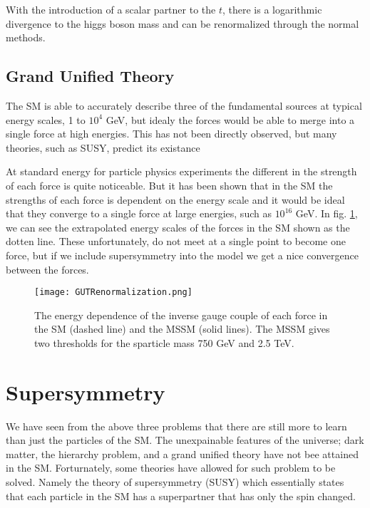 With the introduction of a scalar partner to the $t$, there is a logarithmic divergence to the higgs boson mass and can be renormalized through the normal methods.

\subsection{Grand Unified Theory}

The SM is able to accurately describe three of the fundamental sources at typical energy scales, 1 to $10^{4}$ GeV, but idealy the forces would be able to merge into a single force at high energies. This has not been directly observed, but many theories, such as SUSY, predict its existance %

At standard energy for particle physics experiments the different in the strength of each force is quite noticeable. But it has been shown that in the SM the strengths of each force is dependent on the energy scale and it would be ideal that they converge to a single force at large energies, such as $10^16$ GeV. In fig. \ref{GUT}, we can see the extrapolated energy scales of the forces in the SM shown as the dotten line. These unfortunately, do not meet at a single point to become one force, but if we include supersymmetry into the model we get a nice convergence between the forces.

\begin{figure}
 	\centering
	\texttt{[image: GUTRenormalization.png]}
 	\caption{The energy dependence of the inverse gauge couple of each force in the SM (dashed line) and the MSSM (solid lines). The MSSM gives two thresholds for the sparticle mass 750 GeV and 2.5 TeV.}
 	\label{GUT} 
\end{figure}

\section{Supersymmetry}

We have seen from the above three problems that there are still more to learn than just the particles of the SM. The unexpainable features of the universe; dark matter, the hierarchy problem, and a grand unified theory have not bee attained in the SM. Forturnately, some theories have allowed for such problem to be solved. Namely the theory of supersymmetry (SUSY) which essentially states that each particle in the SM has a superpartner that has only the spin changed.


